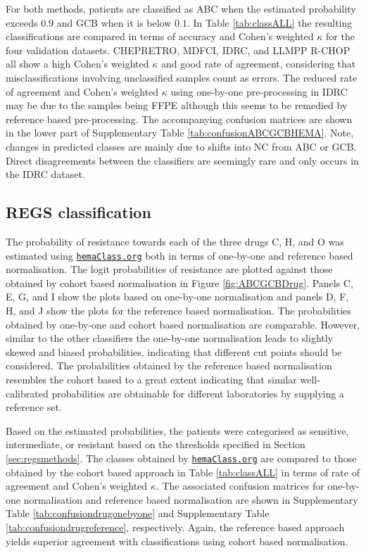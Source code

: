 \documentclass{bmcart}
\newcommand{\hemaClass}{\href{http://hemaClass.org}{\texttt{hemaClass.org}}}
\begin{document}
For both methods, patients are classified as ABC when the estimated probability exceeds $0.9$ and GCB when it is below $0.1$.
In Table \ref{tab:classALL} the resulting classifications are compared in terms of accuracy and Cohen's weighted $\kappa$ for the four validation datasets.
CHEPRETRO, MDFCI, IDRC, and LLMPP R-CHOP all show a high Cohen's weighted $\kappa$ and good rate of agreement, considering that misclassifications involving unclassified samples count as errors.
The reduced rate of agreement and Cohen's weighted $\kappa$ using one-by-one pre-processing in IDRC may be due to the samples being FFPE although this seems to be remedied by reference based pre-processing.
The accompanying confusion matrices are shown in the lower part of Supplementary Table \ref{tab:confusionABCGCBHEMA}.
Note, changes in predicted classes are mainly due to shifts into NC from ABC or GCB.
Direct disagreements between the classifiers are seemingly rare and only occurs in the IDRC dataset.




\subsection{REGS classification}
The probability of resistance towards each of the three drugs C, H, and O was estimated using \hemaClass{} both in terms of one-by-one and reference based normalisation.
The logit probabilities of resistance are plotted against those obtained by cohort based normalisation in Figure \ref{fig:ABCGCBDrug}.
Panels C, E, G, and I show the plots based on one-by-one normalisation and panels D, F, H, and J show the plots for the reference based normalisation.
The probabilities obtained by one-by-one and cohort based normalisation are comparable. However, similar to the other classifiers the one-by-one normalisation leads to slightly skewed and biased probabilities, indicating that different cut points should be considered.
The probabilities obtained by the reference based normalisation resembles the cohort based to a great extent indicating that similar well-calibrated probabilities are obtainable for different laboratories by supplying a reference set.

Based on the estimated probabilities, the patients were categorised as sensitive, intermediate, or resistant based on the thresholds specified in Section \ref{sec:regsmethods}.
The classes obtained by \hemaClass{} are compared to those obtained by the cohort based approach in Table \ref{tab:classALL} in terms of rate of agreement and Cohen's weighted $\kappa$.
The associated confusion matrices for one-by-one normalisation and reference based normalisation are shown in Supplementary Table \ref{tab:confusiondrugonebyone} and Supplementary Table \ref{tab:confusiondrugreference}, respectively.
Again, the reference based approach yields superior agreement with classifications using cohort based normalisation.
\end{document}
